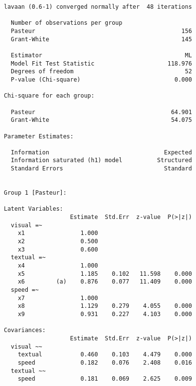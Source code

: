\begin{Shaded}
\begin{Highlighting}[]
\StringTok{ }
            \NormalTok{)}
\end{Highlighting}
\end{Shaded}

\begin{verbatim}
lavaan (0.6-1) converged normally after  48 iterations

  Number of observations per group         
  Pasteur                                          156
  Grant-White                                      145

  Estimator                                         ML
  Model Fit Test Statistic                     118.976
  Degrees of freedom                                52
  P-value (Chi-square)                           0.000

Chi-square for each group:

  Pasteur                                       64.901
  Grant-White                                   54.075

Parameter Estimates:

  Information                                 Expected
  Information saturated (h1) model          Structured
  Standard Errors                             Standard


Group 1 [Pasteur]:

Latent Variables:
                   Estimate  Std.Err  z-value  P(>|z|)
  visual =~                                           
    x1                1.000                           
    x2                0.500                           
    x3                0.600                           
  textual =~                                          
    x4                1.000                           
    x5                1.185    0.102   11.598    0.000
    x6         (a)    0.876    0.077   11.409    0.000
  speed =~                                            
    x7                1.000                           
    x8                1.129    0.279    4.055    0.000
    x9                0.931    0.227    4.103    0.000

Covariances:
                   Estimate  Std.Err  z-value  P(>|z|)
  visual ~~                                           
    textual           0.460    0.103    4.479    0.000
    speed             0.182    0.076    2.408    0.016
  textual ~~                                          
    speed             0.181    0.069    2.625    0.009


\end{verbatim}
